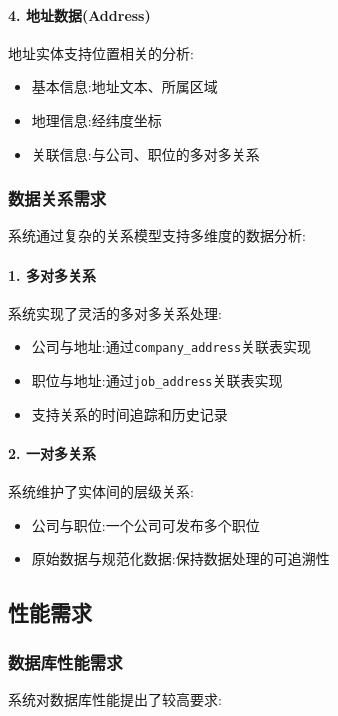 \paragraph{4. 地址数据(Address)}
地址实体支持位置相关的分析:
\begin{itemize}
    \item 基本信息:地址文本、所属区域
    \item 地理信息:经纬度坐标
    \item 关联信息:与公司、职位的多对多关系
\end{itemize}

\subsubsection{数据关系需求}

系统通过复杂的关系模型支持多维度的数据分析:

\paragraph{1. 多对多关系}
系统实现了灵活的多对多关系处理:
\begin{itemize}
    \item 公司与地址:通过\texttt{company\_address}关联表实现
    \item 职位与地址:通过\texttt{job\_address}关联表实现
    \item 支持关系的时间追踪和历史记录
\end{itemize}

\paragraph{2. 一对多关系}
系统维护了实体间的层级关系:
\begin{itemize}
    \item 公司与职位:一个公司可发布多个职位
    \item 原始数据与规范化数据:保持数据处理的可追溯性
\end{itemize}

\subsection{性能需求}

\subsubsection{数据库性能需求}

系统对数据库性能提出了较高要求:

